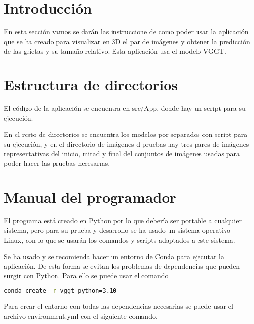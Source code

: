 
\section{Introducción}
En esta sección vamos se darán las instruccione de como poder usar la aplicación que se ha creado para visualizar en 3D el par de imágenes y obtener la predicción de las grietas y su tamaño relativo. Esta aplicación usa el modelo VGGT.

\section{Estructura de directorios}

El código de la aplicación se encuentra en src/App, donde hay un script para su ejecución.

En el resto de directorios se encuentra los modelos por separados con script para su ejecución, y en el directorio de imágenes d pruebas hay tres pares de imágenes representativas del inicio, mitad y final del conjuntos de imágenes usadas para poder hacer las pruebas necesarias.


\section{Manual del programador}
El programa está creado en Python por lo que debería ser portable a cualquier sistema, pero para su prueba y desarrollo se ha usado un sistema operativo Linux, con lo que se usarán los comandos y scripts adaptados a este sistema.

Se ha usado y se recomienda hacer un entorno de Conda para ejecutar la aplicación. De esta forma se evitan los problemas de dependencias que pueden surgir con Python. Para ello se puede usar el comando

\begin{lstlisting}[language=bash]
	conda create -n vggt python=3.10
\end{lstlisting}

Para crear el entorno con todas las dependencias necesarias se puede usar el archivo environment.yml con el siguiente comando.

